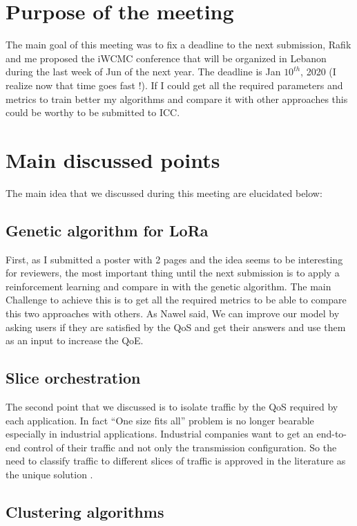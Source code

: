 \section{Purpose of the meeting}

The main goal of this meeting was to fix a deadline to the next submission,
	Rafik and me proposed the iWCMC conference that will be organized in Lebanon during the last week of Jun of the next year.
The deadline is Jan $10^{th}$, 2020 (I realize now that time goes fast !).
If I could get all the required parameters and metrics to train better my algorithms and compare it with other approaches this could be worthy to be submitted to ICC.

\section{Main discussed points}

The main idea that we discussed during this meeting are elucidated below:
	
\subsection{Genetic algorithm for LoRa}

First,
	as I submitted a poster with 2 pages and the idea seems to be interesting for reviewers,
	the most important thing until the next submission is to apply a reinforcement learning and compare in with the genetic algorithm.
The main Challenge to achieve this is to get all the required metrics to be able to compare this two approaches with others.
As Nawel said,
	We can improve our model by asking users if they are satisfied by the QoS and get their answers and use them as an input to increase the QoE.

\subsection{Slice orchestration}

The second point that we discussed is to isolate traffic by the QoS required by each application.
In fact ``One size fits all'' problem is no longer bearable especially in industrial applications.
Industrial companies want to get an end-to-end control of their traffic and not only the transmission configuration.
So the need to classify traffic to different slices of traffic is approved in the literature as the unique solution \cite{chang_ran_2018}.

\subsection{Clustering algorithms}

